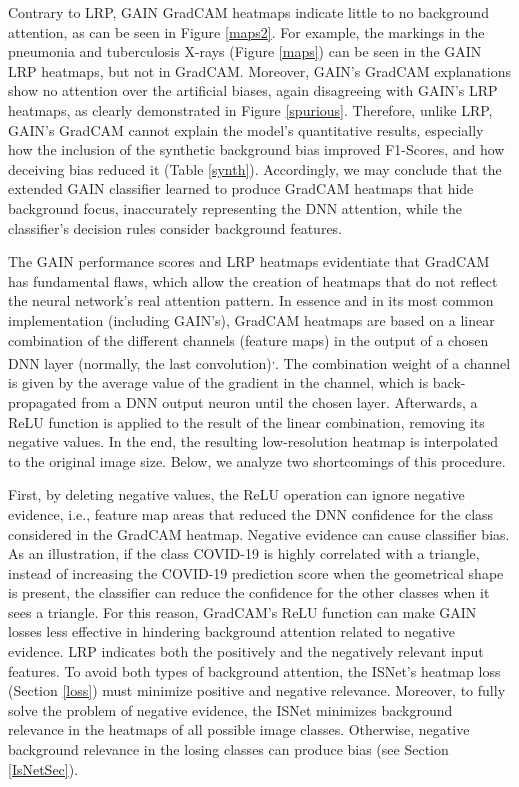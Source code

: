 \documentclass[fleqn,10pt]{wlscirep}
\begin{document}
{Contrary to LRP, GAIN GradCAM heatmaps indicate little to no background attention, as can be seen in Figure \ref{maps2}. For example, the markings in the pneumonia and tuberculosis X-rays (Figure \ref{maps}) can be seen in the GAIN LRP heatmaps, but not in GradCAM. Moreover, GAIN's GradCAM explanations show no attention over the artificial biases, again disagreeing with GAIN's LRP heatmaps, as clearly demonstrated in Figure \ref{spurious}. Therefore, unlike LRP, GAIN's GradCAM cannot explain the model's quantitative results, especially how the inclusion of the synthetic background bias improved F1-Scores, and how deceiving bias reduced it (Table \ref{synth}). Accordingly, we may conclude that the extended GAIN classifier learned to produce GradCAM heatmaps that hide background focus, inaccurately representing the DNN attention, while the classifier's decision rules consider background features.

The GAIN performance scores and LRP heatmaps evidentiate that GradCAM has fundamental flaws, which allow the creation of heatmaps that do not reflect the neural network's real attention pattern. In essence and in its most common implementation (including GAIN's), GradCAM heatmaps are based on a linear combination of the different channels (feature maps) in the output of a chosen DNN layer (normally, the last convolution)\cite{GAIN}\textsuperscript{,}\cite{GradCAM}. The combination weight of a channel is given by the average value of the gradient in the channel, which is back-propagated from a DNN output neuron until the chosen layer. Afterwards, a ReLU function is applied to the result of the linear combination, removing its negative values. In the end, the resulting low-resolution heatmap is interpolated to the original image size. Below, we analyze two shortcomings of this procedure.

First, by deleting negative values, the ReLU operation can ignore negative evidence, i.e., feature map areas that reduced the DNN confidence for the class considered in the GradCAM heatmap. Negative evidence can cause classifier bias. As an illustration, if the class COVID-19 is highly correlated with a triangle, instead of increasing the COVID-19 prediction score when the geometrical shape is present, the classifier can reduce the confidence for the other classes when it sees a triangle. For this reason, GradCAM's ReLU function can make GAIN losses less effective in hindering background attention related to negative evidence. LRP indicates both the positively and the negatively relevant input features. To avoid both types of background attention, the ISNet's heatmap loss (Section \ref{loss}) must minimize positive and negative relevance. Moreover, to fully solve the problem of negative evidence, the ISNet minimizes background relevance in the heatmaps of all possible image classes. Otherwise, negative background relevance in the losing classes can produce bias (see Section \ref{IsNetSec}).

}
\end{document}
